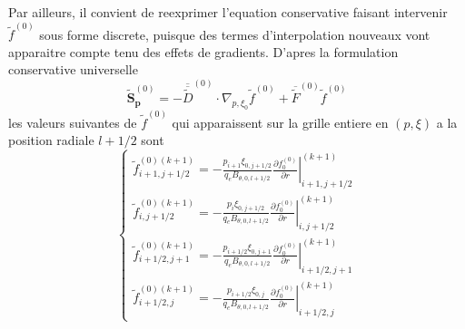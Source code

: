 Par ailleurs, il convient de reexprimer l'equation conservative faisant
intervenir $\widetilde{f}^{(0)}$ sous forme discrete, puisque des
termes d'interpolation nouveaux vont apparaitre compte tenu des effets
de gradients. D'apres la formulation conservative universelle \[
\widetilde{\mathbf{S}}_{\mathbf{p}}^{(0)}=-\overline{\overline{\widetilde{D}}}^{(0)}\cdot\nabla_{p,\xi_{0}}\widetilde{f}^{(0)}+\overline{\widetilde{F}}^{(0)}\widetilde{f}^{(0)}\]
 les valeurs suivantes de $\widetilde{f}^{(0)}$ qui apparaissent
sur la grille entiere en $\left(p,\xi\right)$ a la position radiale
$l+1/2$ sont \[
\left\{ \begin{array}{l}
\widetilde{f}_{i+1,j+1/2}^{\left(0\right)(k+1)}=-\frac{p_{i+1}\xi_{0,j+1/2}}{q_{e}B_{\theta,0,l+1/2}}\left.\frac{\partial f_{0}^{(0)}}{\partial r}\right|_{i+1,j+1/2}^{(k+1)}\\
\widetilde{f}_{i,j+1/2}^{\left(0\right)(k+1)}=-\frac{p_{i}\xi_{0,j+1/2}}{q_{e}B_{\theta,0,l+1/2}}\left.\frac{\partial f_{0}^{(0)}}{\partial r}\right|_{i,j+1/2}^{(k+1)}\\
\widetilde{f}_{i+1/2,j+1}^{\left(0\right)(k+1)}=-\frac{p_{i+1/2}\xi_{0,j+1}}{q_{e}B_{\theta,0,l+1/2}}\left.\frac{\partial f_{0}^{(0)}}{\partial r}\right|_{i+1/2,j+1}^{(k+1)}\\
\widetilde{f}_{i+1/2,j}^{\left(0\right)(k+1)}=-\frac{p_{i+1/2}\xi_{0,j}}{q_{e}B_{\theta,0,l+1/2}}\left.\frac{\partial f_{0}^{(0)}}{\partial r}\right|_{i+1/2,j}^{(k+1)}\end{array}\right.\]


